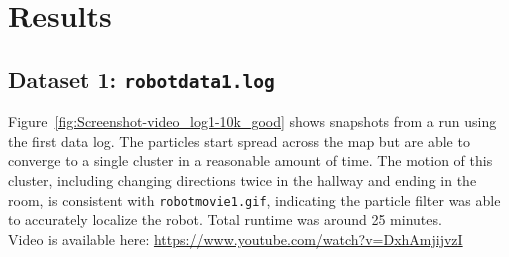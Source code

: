 \section{Results}

\subsection{Dataset 1: \texttt{robotdata1.log}}

Figure~\ref{fig:Screenshot-video_log1-10k_good} shows snapshots from a run using the first data log. The particles start spread across the map but are able to converge to a single cluster in a reasonable amount of time. The motion of this cluster, including changing directions twice in the hallway and ending in the room, is consistent with \texttt{robotmovie1.gif}, indicating the particle filter was able to accurately localize the robot. Total runtime was around 25 minutes.\\ Video is available here: \url{https://www.youtube.com/watch?v=DxhAmjijvzI}

